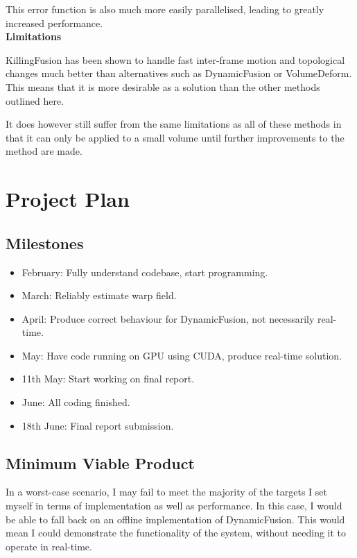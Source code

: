 \documentclass[a4paper]{article}
\begin{document}
This error function is also much more easily parallelised, leading to greatly increased performance.\\


\noindent\textbf{Limitations}

KillingFusion has been shown to handle fast inter-frame motion and topological changes much better than alternatives such as DynamicFusion or VolumeDeform. This means that it is more desirable as a solution than the other methods outlined here.

It does however still suffer from the same limitations as all of these methods in that it can only be applied to a small volume until further improvements to the method are made.

\section{Project Plan}

\subsection{Milestones}
\begin{itemize}
\item February: Fully understand codebase, start programming.
\item March: Reliably estimate warp field.
\item April: Produce correct behaviour for DynamicFusion, not necessarily real-time.
\item May: Have code running on GPU using CUDA, produce real-time solution.
\item 11th May: Start working on final report.
\item June: All coding finished.
\item 18th June: Final report submission.
\end{itemize}

\subsection{Minimum Viable Product}

In a worst-case scenario, I may fail to meet the majority of the targets I set myself in terms of implementation as well as performance. In this case, I would be able to fall back on an offline implementation of DynamicFusion. This would mean I could demonstrate the functionality of the system, without needing it to operate in real-time.
\end{document}
